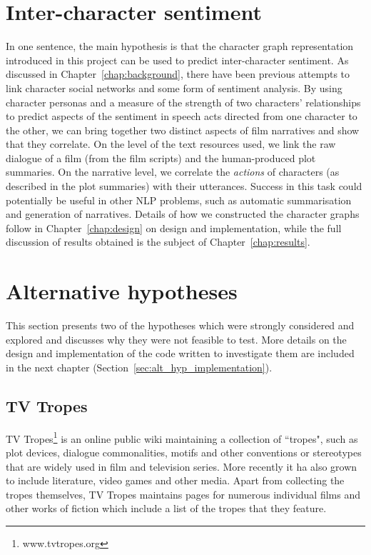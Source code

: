 \documentclass[bsc,frontabs,singlespacing,parskip, twoside]{infthesis}
\begin{document}
\section{Inter-character sentiment}
In one sentence, the main hypothesis is that the character graph representation introduced in this project can be used to predict inter-character sentiment. As discussed in Chapter~\ref{chap:background}, there have been previous attempts to link character social networks and some form of sentiment analysis. By using character personas and a measure of the strength of two characters' relationships to predict aspects of the sentiment in speech acts directed from one character to the other, we can bring together two distinct aspects of film narratives and show that they correlate. On the level of the text resources used, we link the raw dialogue of a film (from the film scripts) and the human-produced plot summaries. On the narrative level, we correlate the \textit{actions} of characters (as described in the plot summaries) with their utterances. Success in this task could potentially be useful in other NLP problems, such as automatic summarisation and generation of narratives. Details of how we constructed the character graphs follow in Chapter~\ref{chap:design} on design and implementation, while the full discussion of results obtained is the subject of Chapter~\ref{chap:results}.

\section{Alternative hypotheses}

This section presents two of the hypotheses which were strongly considered and explored and discusses why they were not feasible to test. More details on the design and implementation of the code written to investigate them are included in the next chapter (Section~\ref{sec:alt_hyp_implementation}).

\subsection{TV Tropes}
\label{sec:alt_tropes}
TV Tropes\footnote{www.tvtropes.org} is an online public wiki maintaining a collection of ``tropes", such as plot devices, dialogue commonalities, motifs and other conventions or stereotypes that are widely used in film and television series. More recently it ha also grown to include literature, video games and other media. Apart from collecting the tropes themselves, TV Tropes maintains pages for numerous individual films and other works of fiction which include a list of the tropes that they feature.
\end{document}
